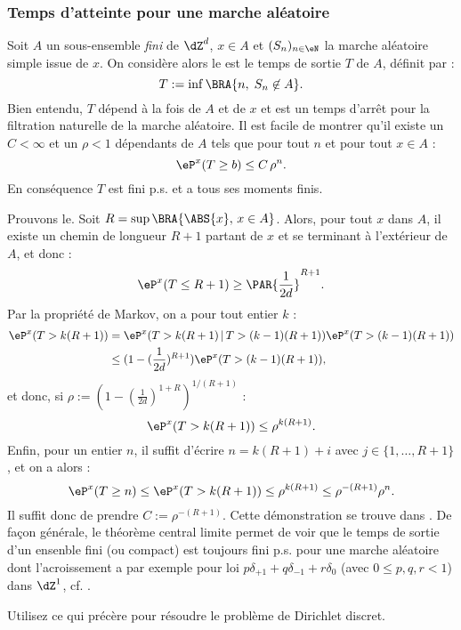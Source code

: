 
%
\subsubsection{Temps d'atteinte pour une marche aléatoire}
%

Soit $A$ un sous-ensemble \emph{fini} de $\dZ^d$, $x\in A$ et
$(S_n)_{n\in\eN}$ la marche aléatoire simple issue de $x$.  On
considère alors le est le temps de sortie $T$ de $A$, définit par :
$$
T:=\inf\BRA{n,\;S_n\not\in A}.
$$
Bien entendu, $T$ dépend à la fois de $A$ et de $x$ et est un temps
d'arrêt pour la filtration naturelle de la marche aléatoire. Il est
facile de montrer qu'il existe un $C<\infty$ et un $\rho<1$ dépendants
de $A$ tels que pour tout $n$ et pour tout $x\in A$ :
$$
\eP^x(T\geq b) \leq C\,\rho^n.
$$
En conséquence $T$ est fini p.s. et a tous ses moments finis.

Prouvons le. Soit $R=\sup\BRA{\ABS{x},\,x\in A}$. Alors, pour tout $x$
dans $A$, il existe un chemin de longueur $R+1$ partant de $x$ et se
terminant à l'extérieur de $A$, et donc :
$$
\eP^x(T \leq R+1) \geq \PAR{\frac{1}{2d}}^{R+1}.
$$
Par la propriété de Markov, on a pour tout entier $k$ :
\begin{align*}
\eP^x(T>k(R+1))
&=\eP^x(T>k(R+1)\,\vert\,T>(k-1)(R+1)) \eP^x(T>(k-1)(R+1)) \\
&\leq (1-(\frac{1}{2d})^{R+1})\eP^x(T>(k-1)(R+1)),
\end{align*}
et donc, si $\rho:=(1-(\frac{1}{2d})^{1+R})^{1/(R+1)}$ :
$$
\eP^x(T>k(R+1)) \leq \rho^{k(R+1)}.
$$
Enfin, pour un entier $n$, il suffit d'écrire $n=k(R+1)+i$ avec
$j\in\{1,\ldots,R+1\}$, et on a alors :
$$
\eP^x(T\geq n) \leq \eP^x(T>k(R+1)) \leq \rho^{k(R+1)} \leq
\rho^{-(R+1)}\rho^n.
$$
Il suffit donc de prendre $C:=\rho^{-(R+1)}$.  Cette démonstration
se trouve dans \cite[Lemme 1.4.4]{lawler}.  De façon générale, le
théorème central limite permet de voir que le temps de sortie d'un
ensenble fini (ou compact) est toujours fini p.s.  pour une marche
aléatoire dont l'acroissement a par exemple pour loi
$p\delta_{+1}+q\delta_{-1}+r\delta_0$ (avec $0\leq p,q,r<1$) dans $\dZ^1$, cf.
\cite[exercice 8.8 page 247]{cottrell-duhamel}.


\begin{exo}
Utilisez ce qui précère pour résoudre le problème de Dirichlet discret.
\end{exo}

